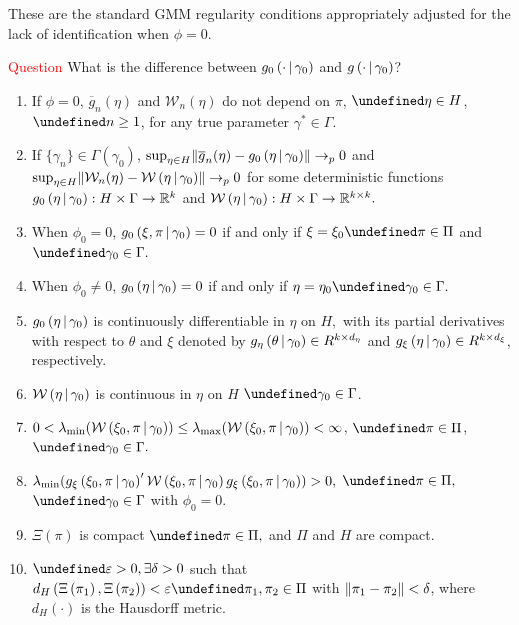 \documentclass[11pt]{article}
\newcommand{\red}[1]{\textcolor{red}{#1}}
\newcommand*{\R}{\mathbb{R}}
\newcommand*{\W}{\mathcal{W}}
\newcommand*{\pto}{\ensuremath{\to_p}}
\newcommand*{\Eta}{H}
\newcommand*{\sampmom}{\ensuremath{\overline{g}_n}}
\DeclarePairedDelimiter\norm{\lVert}{\rVert}
\let\oldforall\forall
\let\forall\undefined
\DeclareMathOperator{\forall}{\oldforall}
\newcommand{\mvert}[1][\middle]{\ensuremath{\,#1\vert\,}}
\begin{document}
These are the standard GMM regularity conditions appropriately adjusted for the lack of identification when $\phi
=0$.

\red{Question}
What is the difference between $g_0\left(\cdot \mvert \gamma_0\right)$ and $g\left(\cdot \mvert \gamma_0\right)$?


\begin{enumerate}
    \item If $\phi=0$, $\sampmom(\eta)$ and $\W_{n}(\eta)$ do not depend on $\pi$, 
        $\forall \eta \in \Eta$, $\forall n \geq 1$, for any true parameter $\gamma^{\ast}\in \Gamma.$
    \item If $\lbrace \gamma_{n} \rbrace \in \Gamma\left(\gamma_0\right)$, $\sup_{\eta \in \Eta}
        \norm*{\sampmom(\eta) - g_0\left(\eta \mvert \gamma_0\right)} \pto 0$ and $\sup_{\eta
        \in \Eta} \norm{\W_{n}(\eta)-\W\left(\eta \mvert \gamma_0\right)} \pto 0$ for some deterministic
        functions $g_0\left(\eta \mvert \gamma_0\right) : \Eta \times \Gamma \to \R^{k}$ and
        $\W\left(\eta \mvert \gamma_0\right) : \Eta \times \Gamma \to \R^{k\times k}.$
    \item When $\phi_0=0$,  $g_0\left(\xi ,\pi \mvert \gamma_0\right) = 0$ if and only if $\xi =\xi_0 \forall
        \pi \in \Pi$ and  $\forall \gamma_0\in \Gamma.$
    \item When $\phi_0 \neq 0$, $g_0\left(\eta \mvert \gamma_0\right)=0$ if and only if $\eta =\eta_0
        \forall \gamma_0 \in \Gamma.$
    \item  $g_0\left(\eta \mvert \gamma_0\right)$ is continuously differentiable in $\eta $ on $\Eta,$ with its
        partial derivatives with respect to $\theta$ and $\xi$ denoted by $g_{\eta }\left(\theta \mvert
        \gamma_0\right) \in R^{k\times d_{\eta }}$ and $g_{\xi }\left(\eta \mvert \gamma_0\right)\in R^{k\times
        d_{\xi }}$, respectively.
    \item $\W\left(\eta \mvert \gamma_0\right)$ is continuous in $\eta$ on $\Eta$ $\forall \gamma_0\in \Gamma$.
    \item $0 < \lambda_{\min}(\W\left(\xi_0, \pi \mvert \gamma_0\right))\leq \lambda_{\max }(\W\left(\xi_0,\pi
        \mvert \gamma_0\right)) < \infty$, $\forall \pi \in \Pi$, $\forall \gamma_0\in \Gamma .$
    \item $\lambda_{\min} (g_{\xi}\left(\xi_0,\pi \mvert \gamma_0\right)^{\prime} \W\left(\xi_0,\pi \mvert
        \gamma_0\right)g_{\xi }\left(\xi_0,\pi \mvert \gamma_0\right))>0,$ $\forall \pi \in \Pi ,$ $\forall
        \gamma_0\in \Gamma $ with $\phi_0=0.$
    \item$\Xi(\pi)$ is compact $\forall \pi \in \Pi ,$ and $\Pi $ and $\Eta $ are compact.
    \item $\forall \varepsilon > 0, \exists \delta > 0$ such that $d_{H}\left(\Xi \left(\pi_{1}\right), \Xi \left(
        \pi_{2}\right) \right) < \varepsilon \forall \pi_{1}, \pi_{2}\in \Pi$ with $\norm*{\pi_{1}-\pi_{2}} <
        \delta$, where $d_{H}\left( \cdot \right) $ is the Hausdorff metric.
\end{enumerate}
\end{document}
